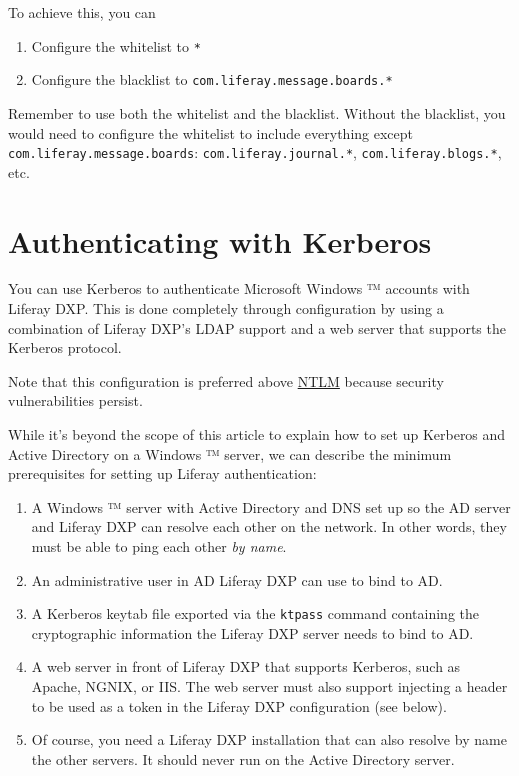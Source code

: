 To achieve this, you can

\begin{enumerate}
\def\labelenumi{\arabic{enumi}.}
\tightlist
\item
  Configure the whitelist to \texttt{*}
\item
  Configure the blacklist to \texttt{com.liferay.message.boards.*}
\end{enumerate}

Remember to use both the whitelist and the blacklist. Without the
blacklist, you would need to configure the whitelist to include
everything except \texttt{com.liferay.message.boards}:
\texttt{com.liferay.journal.*}, \texttt{com.liferay.blogs.*}, etc.

\section{Authenticating with
Kerberos}\label{authenticating-with-kerberos}

You can use Kerberos to authenticate Microsoft Windows ™ accounts with
Liferay DXP. This is done completely through configuration by using a
combination of Liferay DXP's LDAP support and a web server that supports
the Kerberos protocol.

Note that this configuration is preferred above
\href{/docs/7-1/deploy/-/knowledge_base/d/ntlm-single-sign-on-authentication}{NTLM}
because security vulnerabilities persist.

While it's beyond the scope of this article to explain how to set up
Kerberos and Active Directory on a Windows ™ server, we can describe the
minimum prerequisites for setting up Liferay authentication:

\begin{enumerate}
\def\labelenumi{\arabic{enumi}.}
\item
  A Windows ™ server with Active Directory and DNS set up so the AD
  server and Liferay DXP can resolve each other on the network. In other
  words, they must be able to ping each other \emph{by name}.
\item
  An administrative user in AD Liferay DXP can use to bind to AD.
\item
  A Kerberos keytab file exported via the \texttt{ktpass} command
  containing the cryptographic information the Liferay DXP server needs
  to bind to AD.
\item
  A web server in front of Liferay DXP that supports Kerberos, such as
  Apache, NGNIX, or IIS. The web server must also support injecting a
  header to be used as a token in the Liferay DXP configuration (see
  below).
\item
  Of course, you need a Liferay DXP installation that can also resolve
  by name the other servers. It should never run on the Active Directory
  server.
\end{enumerate}

